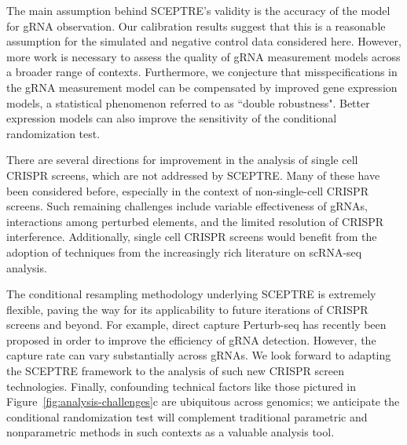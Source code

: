 \documentclass{nature}
\begin{document}
The main assumption behind SCEPTRE's validity is the accuracy of the model for gRNA observation. Our calibration results suggest that this is a reasonable assumption for the simulated and negative control data considered here. However, more work is necessary to assess the quality of gRNA measurement models across a broader range of contexts. Furthermore, we conjecture that misspecifications in the gRNA measurement model can be compensated by improved gene expression models, a statistical phenomenon referred to as ``double robustness"\cite{Robins2001,VanderLaan2003}. Better expression models can also improve the sensitivity of the conditional randomization test\cite{Katsevich2020a}.

There are several directions for improvement in the analysis of single cell CRISPR screens, which are not addressed by SCEPTRE. Many of these have been considered before, especially in the context of non-single-cell CRISPR screens. Such remaining challenges include variable effectiveness of gRNAs\cite{Li2015,Daley2018,Xie2019}, interactions among perturbed elements\cite{Xie2017,Zamanighomi2019,Norman2019}, and the limited resolution of CRISPR interference\cite{Hsu2018}. Additionally, single cell CRISPR screens would benefit from the adoption of techniques from the increasingly rich literature on scRNA-seq analysis. 

The conditional resampling methodology underlying SCEPTRE is extremely flexible, paving the way for its applicability to future iterations of CRISPR screens and beyond. For example, direct capture Perturb-seq\cite{Replogle2020} has recently been proposed in order to improve the efficiency of gRNA detection. However, the capture rate can vary substantially across gRNAs. We look forward to adapting the SCEPTRE framework to the analysis of such new CRISPR screen technologies. Finally, confounding technical factors like those pictured in Figure~\ref{fig:analysis-challenges}c are ubiquitous across genomics; we anticipate the conditional randomization test will complement traditional parametric and nonparametric methods in such contexts as a valuable analysis tool.



\clearpage
\end{document}
